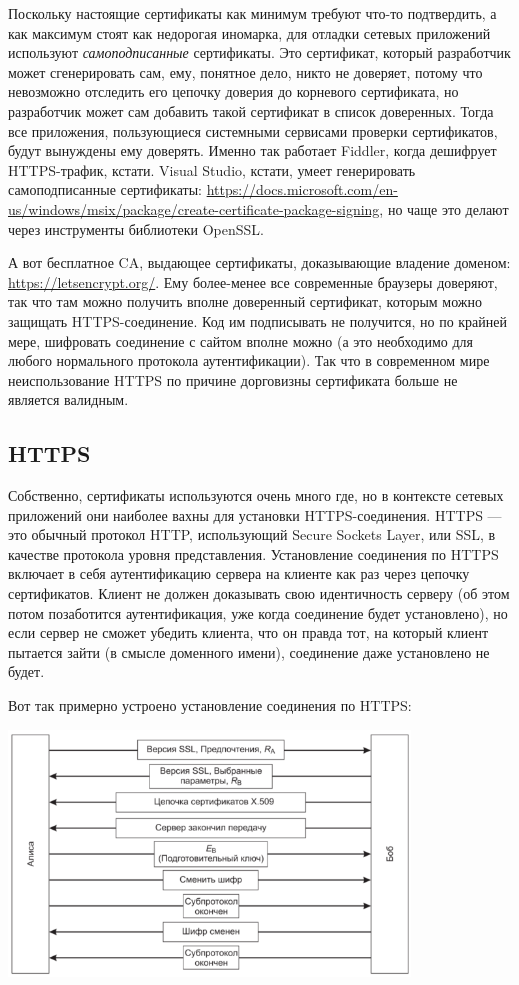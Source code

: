\documentclass{../../text-style}
\begin{document}
Поскольку настоящие сертификаты как минимум требуют что-то подтвердить, а как максимум стоят как недорогая иномарка, для отладки сетевых приложений используют \textit{самоподписанные} сертификаты. Это сертификат, который разработчик может сгенерировать сам, ему, понятное дело, никто не доверяет, потому что невозможно отследить его цепочку доверия до корневого сертификата, но разработчик может сам добавить такой сертификат в список доверенных. Тогда все приложения, пользующиеся системными сервисами проверки сертификатов, будут вынуждены ему доверять. Именно так работает Fiddler, когда дешифрует HTTPS-трафик, кстати. Visual Studio, кстати, умеет генерировать самоподписанные сертификаты: \url{https://docs.microsoft.com/en-us/windows/msix/package/create-certificate-package-signing}, но чаще это делают через инструменты библиотеки OpenSSL. 

А вот бесплатное CA, выдающее сертификаты, доказывающие владение доменом: \url{https://letsencrypt.org/}. Ему более-менее все современные браузеры доверяют, так что там можно получить вполне доверенный сертификат, которым можно защищать HTTPS-соединение. Код им подписывать не получится, но по крайней мере, шифровать соединение с сайтом вполне можно (а это необходимо для любого нормального протокола аутентификации). Так что в современном мире неиспользование HTTPS по причине дорговизны сертификата больше не является валидным.

\subsection{HTTPS}

Собственно, сертификаты используются очень много где, но в контексте сетевых приложений они наиболее вахны для установки HTTPS-соединения. HTTPS --- это обычный протокол HTTP, использующий Secure Sockets Layer, или SSL, в качестве протокола уровня представления. Установление соединения по HTTPS включает в себя аутентификацию сервера на клиенте как раз через цепочку сертификатов. Клиент не должен доказывать свою идентичность серверу (об этом потом позаботится аутентификация, уже когда соединение будет установлено), но если сервер не сможет убедить клиента, что он правда тот, на который клиент пытается зайти (в смысле доменного имени), соединение даже установлено не будет.

Вот так примерно устроено установление соединения по HTTPS:

\begin{center}
    \includegraphics[width=0.8\textwidth]{ssl.png}
\end{center}
\end{document}
